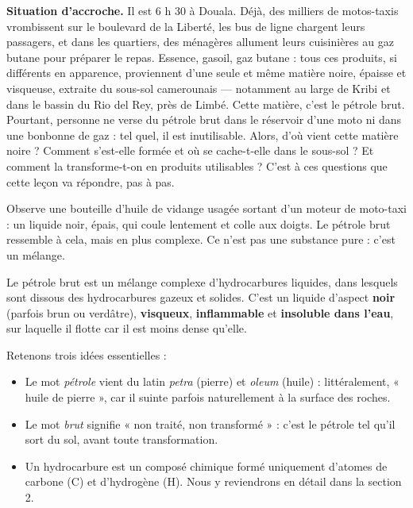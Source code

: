 \documentclass[11pt]{article}
\newcommand{\cle}[1]{{\popxbold\color{popdark}#1}}
\newcounter{popsec}
\newcounter{popsub}
\newcommand{\courssub}[1]{%
  \stepcounter{popsub}%
  \par\vspace{9pt}\noindent{\popxbold\fontsize{11.5}{13}\selectfont\color{popink}{\color{poporange}\thepopsec.\thepopsub}\hspace{6pt}#1}\par\nopagebreak\vspace{4pt}
}
\begin{document}
\textbf{Situation d'accroche.} Il est 6 h 30 à Douala. Déjà, des milliers de motos-taxis vrombissent sur le boulevard de la Liberté, les bus de ligne chargent leurs passagers, et dans les quartiers, des ménagères allument leurs cuisinières au gaz butane pour préparer le repas. Essence, gasoil, gaz butane : tous ces produits, si différents en apparence, proviennent d'une seule et même matière noire, épaisse et visqueuse, extraite du sous-sol camerounais — notamment au large de Kribi et dans le bassin du Rio del Rey, près de Limbé. Cette matière, c'est le \cle{pétrole brut}. Pourtant, personne ne verse du pétrole brut dans le réservoir d'une moto ni dans une bonbonne de gaz : tel quel, il est inutilisable. Alors, d'où vient cette matière noire ? Comment s'est-elle formée et où se cache-t-elle dans le sous-sol ? Et comment la transforme-t-on en produits utilisables ? C'est à ces questions que cette leçon va répondre, pas à pas.

\courssub{Qu'est-ce que le pétrole brut ?}

Observe une bouteille d'huile de vidange usagée sortant d'un moteur de moto-taxi : un liquide noir, épais, qui coule lentement et colle aux doigts. Le pétrole brut ressemble à cela, mais en plus complexe. Ce n'est pas une substance pure : c'est un \cle{mélange}.

\begin{definition}
Le \cle{pétrole brut} est un mélange complexe d'\cle{hydrocarbures} liquides, dans lesquels sont dissous des hydrocarbures gazeux et solides. C'est un liquide d'aspect \textbf{noir} (parfois brun ou verdâtre), \textbf{visqueux}, \textbf{inflammable} et \textbf{insoluble dans l'eau}, sur laquelle il flotte car il est moins dense qu'elle.
\end{definition}

Retenons trois idées essentielles :

\begin{itemize}
\item Le mot \emph{pétrole} vient du latin \emph{petra} (pierre) et \emph{oleum} (huile) : littéralement, « huile de pierre », car il suinte parfois naturellement à la surface des roches.
\item Le mot \emph{brut} signifie « non traité, non transformé » : c'est le pétrole tel qu'il sort du sol, avant toute transformation.
\item Un \cle{hydrocarbure} est un composé chimique formé uniquement d'atomes de \cle{carbone} (C) et d'\cle{hydrogène} (H). Nous y reviendrons en détail dans la section 2.
\end{itemize}
\end{document}
